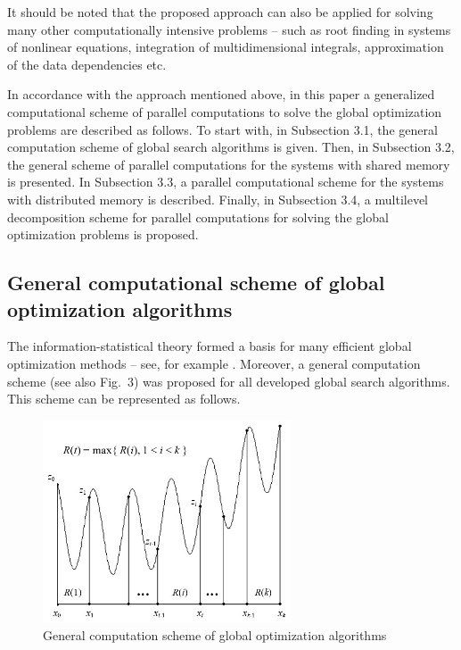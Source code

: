 \documentclass[
11pt,%
tightenlines,%
twoside,%
onecolumn,%
nofloats,%
nobibnotes,%
nofootinbib,%
superscriptaddress,%
noshowpacs,%
centertags]%
{revtex4}
\begin{document}
It should be noted that the proposed approach can also be applied for solving many other computationally intensive problems -- such as root finding in systems of nonlinear equations, integration of multidimensional integrals, approximation of the data dependencies etc.

In accordance with the approach mentioned above, in this paper a generalized computational scheme of parallel computations to solve the global optimization problems are described as follows. To start with, in Subsection 3.1, the general computation scheme of global search algorithms is given. Then, in Subsection 3.2, the general scheme of parallel computations for the systems with shared memory is presented. In Subsection 3.3, a parallel computational scheme for the systems with distributed memory is described. Finally, in Subsection 3.4, a multilevel decomposition scheme for parallel computations for solving the global optimization problems is proposed.

\subsection{General computational scheme of global optimization algorithms}

The information-statistical theory \cite{Strongin1, Strongin3} formed a basis for many efficient global optimization methods -- see, for example \cite{Strongin2, Sergeyev4, Gergel1, Gergel2, Barkalov, Gergel3, Gergel4, Gergel5, Lera}. Moreover, a general computation scheme \cite{Strongin1, Strongin2, Strongin3, Grishagin1, Grishagin2} (see also Fig.~3) was proposed for all developed global search algorithms. This scheme can be represented as follows.

\begin{figure}
\centering
\includegraphics[height=6.0cm]{Fig3}
\caption{General computation scheme of global optimization algorithms}
\label{fig:Fig3}
\end{figure}
\end{document}
